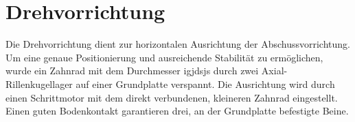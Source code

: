 \section{Drehvorrichtung}
Die Drehvorrichtung dient zur horizontalen Ausrichtung der 
Abschussvorrichtung. Um eine genaue Positionierung und ausreichende Stabilität 
zu ermöglichen, wurde ein Zahnrad mit dem Durchmesser igjdsjs durch zwei 
Axial-Rillenkugellager auf einer Grundplatte verspannt. Die Ausrichtung wird 
durch einen Schrittmotor mit dem direkt verbundenen, kleineren Zahnrad 
eingestellt. Einen guten Bodenkontakt garantieren drei, an der Grundplatte 
befestigte Beine.
